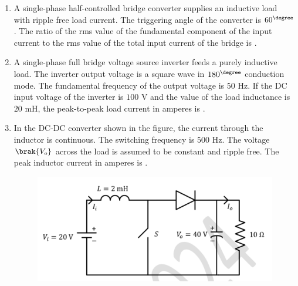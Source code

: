 \documentclass[journal,12pt,onecolumn]{IEEEtran}
\theoremstyle{remark}
\begin{document}
\begin{enumerate}[start=1, label=Q.\arabic*]
    \hfill{}

    \item A single-phase half-controlled bridge converter supplies an inductive load with ripple free load current. The triggering angle of the converter is $60^\degree$. The ratio of the rms value of the fundamental component of the input current to the rms value of the total input current of the bridge is \underline{\hspace{2cm}} .

    \hfill{}

    \item A single-phase full bridge voltage source inverter  feeds a purely inductive load. The inverter output voltage is a square wave in $180^\degree$ conduction mode. The fundamental frequency of the output voltage is $50$ Hz. If the DC input voltage of the inverter is $100$ V and the value of the load inductance is $20$ mH, the peak-to-peak load current in amperes is \underline{\hspace{2cm}} .

    \hfill{}
\item In the DC-DC converter shown in the figure, the current through the inductor is continuous. The switching frequency is $500$ Hz. The voltage $\brak{V_o}$ across the load is assumed to be constant and ripple free. The peak inductor current in amperes is \underline{\hspace{2cm}} .
    \begin{figure}[H]
        \includegraphics[width=0.8\columnwidth]{Figures/q64.png}
        \centering
        \caption{}
    \end{figure}

    \hfill{}


\end{enumerate}
\end{document}
